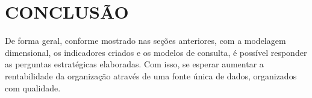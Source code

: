 
\chapter{CONCLUSÃO}

De forma geral, conforme mostrado nas seções anteriores, com a modelagem dimensional, os indicadores criados e os modelos de consulta, é possível responder as perguntas estratégicas elaboradas. Com isso, se esperar aumentar a rentabilidade da organização através de uma fonte única de dados, organizados com qualidade. 
